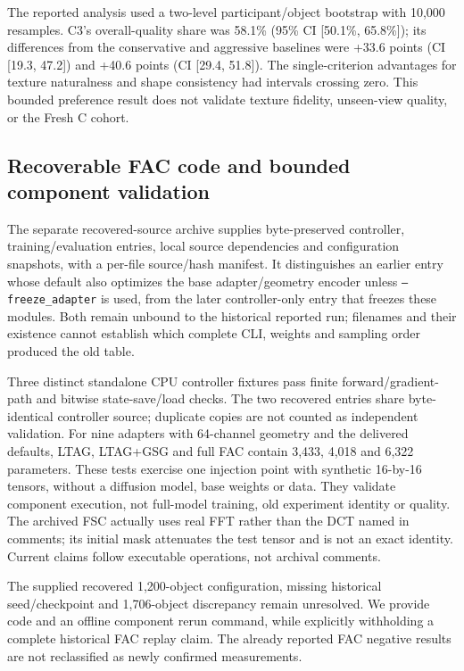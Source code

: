 \documentclass[11pt]{article}
\begin{document}
The reported analysis used a two-level participant/object bootstrap with 10,000 resamples. C3's overall-quality share was 58.1\% (95\% CI [50.1\%, 65.8\%]); its differences from the conservative and aggressive baselines were +33.6 points (CI [19.3, 47.2]) and +40.6 points (CI [29.4, 51.8]). The single-criterion advantages for texture naturalness and shape consistency had intervals crossing zero. This bounded preference result does not validate texture fidelity, unseen-view quality, or the Fresh C cohort.

\FloatBarrier
\subsection*{Recoverable FAC code and bounded component validation}
The separate recovered-source archive supplies byte-preserved controller, training/evaluation entries, local source dependencies and configuration snapshots, with a per-file source/hash manifest. It distinguishes an earlier entry whose default also optimizes the base adapter/geometry encoder unless \texttt{--freeze\_adapter} is used, from the later controller-only entry that freezes these modules. Both remain unbound to the historical reported run; filenames and their existence cannot establish which complete CLI, weights and sampling order produced the old table.

Three distinct standalone CPU controller fixtures pass finite forward/gradient-path and bitwise state-save/load checks. The two recovered entries share byte-identical controller source; duplicate copies are not counted as independent validation. For nine adapters with 64-channel geometry and the delivered defaults, LTAG, LTAG+GSG and full FAC contain 3,433, 4,018 and 6,322 parameters. These tests exercise one injection point with synthetic 16-by-16 tensors, without a diffusion model, base weights or data. They validate component execution, not full-model training, old experiment identity or quality. The archived FSC actually uses real FFT rather than the DCT named in comments; its initial mask attenuates the test tensor and is not an exact identity. Current claims follow executable operations, not archival comments.

The supplied recovered 1,200-object configuration, missing historical seed/checkpoint and 1,706-object discrepancy remain unresolved. We provide code and an offline component rerun command, while explicitly withholding a complete historical FAC replay claim. The already reported FAC negative results are not reclassified as newly confirmed measurements.
\end{document}
